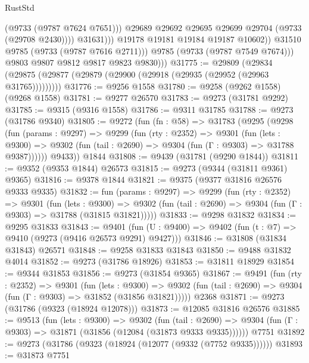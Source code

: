 \begin{lexlean}{RustStd}
\begin{coremodule}
{\begin{coremodule}
{{{{{{{{{{{{{{{{{{{{{{{{{{{{{{{{{{{{{{{{{{{{{{{{{{{{{{{                              (@9733 (@9787 @7624 @7651)))
                            @29689
                            @29692
                            @29695
                            @29699
                            @29704
                            (@9733 (@29708 @2430))))
                        @31631)))
                  @19178
                  @19181
                  @19184
                  @19187
                  @10602))
              @31510
              @9785
              (@9733 (@9787 @7616 @2711)))
            @9785
            (@9733 (@9787 @7549 @7674)))
          @9803
          @9807
          @9812
          @9817
          @9823
          @9830)))
@31775 := @29809
    (@29834 (@29875 (@29877 (@29879 (@29900 (@29918 (@29935 (@29952 (@29963 @31765)))))))))
@31776 := @9256 @1558
@31780 := @9258 (@9262 @1558) (@9268 @1558)
@31781 := @9277 @26570
@31783 := @9273 (@31781 @9292)
@31785 := @9315 (@9316 @1558)
@31786 := @9311 @31785
@31788 := @9273 (@31786 @9340)
@31805 := @9272
    (fun (fn : @58) =>
    @31783
      (@9295
        (@9298
          (fun (params : @9297) =>
          @9299
            (fun (rty : @2352) =>
            @9301
              (fun (lets : @9300) =>
              @9302 (fun (tail : @2690) => @9304 (fun (Γ : @9303) => @31788 @9387))))))
        @9433))
    @1844
@31808 := @9439 (@31781 (@9290 @1844))
@31811 := @9352 (@9353 @1844) @26573
@31815 := @9273 (@9344 (@31811 @9361) @9365)
@31816 := @9378 @1844
@31821 := @9375 (@9377 @31816 @26576 @9333 @9335)
@31832 := fun (params : @9297) =>
  @9299
    (fun (rty : @2352) =>
    @9301
      (fun (lets : @9300) =>
      @9302 (fun (tail : @2690) => @9304 (fun (Γ : @9303) => @31788 (@31815 @31821)))))
@31833 := @9298 @31832
@31834 := @9295 @31833
@31843 := @9401
    (fun (U : @9400) => @9402 (fun (t : @7) => @9410 (@9273 (@9416 @26573 @9291) @9427)))
@31846 := @31808 (@31834 @31843) @26571
@31848 := @9258 @31833 @31843
@31850 := @9488 @31832 @4014
@31852 := @9273 (@31786 @18926)
@31853 := @31811 @18929
@31854 := @9344 @31853
@31856 := @9273 (@31854 @9365)
@31867 := @9491
    (fun (rty : @2352) =>
    @9301
      (fun (lets : @9300) =>
      @9302 (fun (tail : @2690) => @9304 (fun (Γ : @9303) => @31852 (@31856 @31821)))))
    @2368
@31871 := @9273 (@31786 (@9323 (@18924 @12078)))
@31873 := @12085 @31816 @26576
@31885 := @9513
    (fun (lets : @9300) =>
    @9302
      (fun (tail : @2690) =>
      @9304 (fun (Γ : @9303) => @31871 (@31856 (@12084 (@31873 @9333 @9335))))))
    @7751
@31892 := @9273 (@31786 (@9323 (@18924 (@12077 (@9332 (@7752 @9335))))))
@31893 := @31873 @7751
}}}}}}}}}}}}}}}}}}}}}}}}}}}}}}}}}}}}}}}}}}}}}}}}}}}}}}}
\end{coremodule}}
\end{coremodule}
\end{lexlean}
